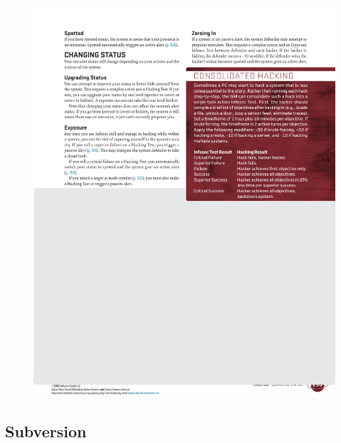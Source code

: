 \begin{figure}[htb!]%
   \includegraphics[scale=1.0]{gfx/mesh-consolidated-hacking}%
\end{figure}%

\bigskip

\subsection*{Subversion}

